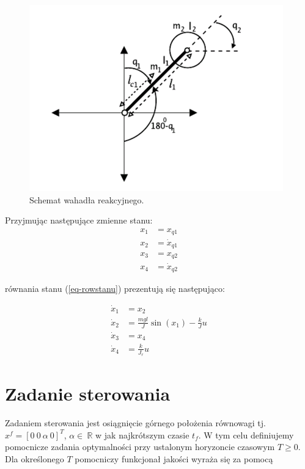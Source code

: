 \documentclass[11pt]{mwart}
\begin{document}
\begin{figure}[ht]
	\begin{centering}
	\includegraphics[scale=1.0]{model}
	\caption{Schemat wahadła reakcyjnego.}
	\label{fig-model}
	\end{centering}
\end{figure}

Przyjmując następujące zmienne stanu:
\begin{equation}
	\label{eq-rowstanu}
	\begin{split}
		x_{1} &= x_{q1} \\
		x_{2} &= \dot{x}_{q1} \\
		x_{3} &= x_{q2} \\
		x_{4} &= \dot{x}_{q2}
	\end{split}
\end{equation}

równania stanu (\ref{eq-rowstanu}) prezentują się następująco:

\begin{equation}
	\label{eq-rowstanu1}
	\begin{split}
		\dot{x}_{1} &= x_2 \\
		\dot{x}_{2} &= \frac{mgl}{J}\sin\left(x_{1}\right)-\frac{k}{J}u \\
		\dot{x}_{3} &= x_{4} \\
		\dot{x}_{4} &= \frac{k}{J_{r}}u
	\end{split}
\end{equation}

\section{Zadanie sterowania}

Zadaniem sterowania jest osiągnięcie górnego położenia równowagi tj. $x^f=[0\ 0\ \alpha\ 0]^T$, $\alpha\in~\mathbb{R}$ w jak najkrótszym czasie $t_f$. W tym celu definiujemy pomocnicze zadania optymalności przy ustalonym horyzoncie czasowym $T\geq0$. Dla określonego $T$ pomocniczy funkcjonał jakości wyraża się za pomocą
\end{document}
